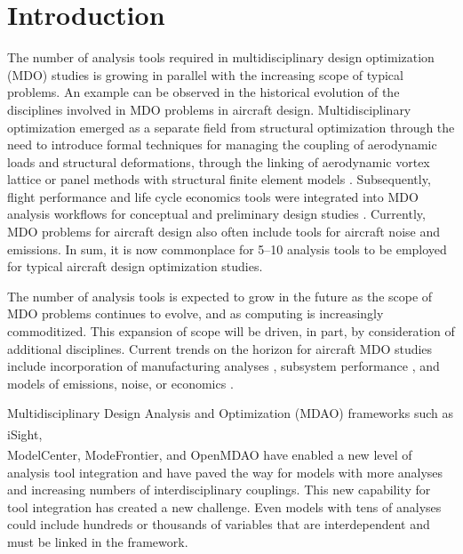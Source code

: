 \section{Introduction}
    \label{s:intro}
    The number of analysis tools required in multidisciplinary design optimization (MDO) studies is growing
    in parallel with the increasing scope of typical problems. An example can
    be observed in the historical evolution of the disciplines involved in MDO problems in aircraft design.
    Multidisciplinary optimization emerged as a separate field from structural optimization through the
    need to introduce formal techniques for managing the coupling of aerodynamic loads and structural
    deformations, through the linking of aerodynamic vortex lattice or panel methods with structural finite
    element models \cite{Cramer1994}. Subsequently, flight performance and life cycle economics tools were integrated
    into MDO analysis workflows for conceptual and preliminary design studies \cite{Sobieski1998}. Currently, MDO
    problems for aircraft design also often include tools for aircraft noise and emissions. In sum, it is now
    commonplace for 5--10 analysis tools to be employed for typical aircraft design optimization studies.
    
    The number of analysis tools is expected to grow in the future as the scope of MDO problems continues
    to evolve, and as computing is increasingly commoditized. This expansion of scope will be driven, in
    part, by consideration of additional disciplines. Current trends on the horizon for aircraft MDO studies
    include incorporation of manufacturing analyses \cite{deWeck2007}, subsystem performance \cite{Dean2009,Gavel2006}, and models of emissions, noise, or economics \cite{Antoine2004,Rallabhandi2007,Kirby2008}.

    Multidisciplinary Design Analysis and Optimization (MDAO)
    frameworks such as iSight\textsuperscript{\textregistered},\\ ModelCenter\textsuperscript{\textregistered}, ModeFrontier\textsuperscript{\textregistered}, and OpenMDAO\cite{Gray2012} have enabled a new level of analysis tool integration 
    and have paved the way for models with more analyses and increasing numbers of interdisciplinary couplings. This 
    new capability for tool integration has created a new challenge. Even models with tens of analyses could include hundreds or thousands
    of variables that are interdependent and must be linked in the framework.
     
